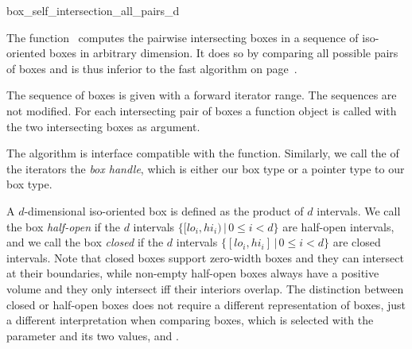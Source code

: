 

\begin{ccRefFunction}{box_self_intersection_all_pairs_d}

\ccDefinition
  
The function \ccRefName\ computes the pairwise intersecting boxes
in a sequence of iso-oriented boxes in arbitrary dimension.
It does so by comparing all possible pairs of boxes and is thus
inferior to the fast  algorithm on 
page~\pageref{ccRef_CGAL::box_self_intersection_d}.

The sequence of boxes is given with a forward iterator range. The
sequences are not modified. For each intersecting pair of boxes a
 function object is called with the two intersecting
boxes as argument.

The algorithm is interface compatible with the
 function. Similarly, we call the
 of the iterators the \emph{box handle}, which is
either our box type or a pointer type to our box type.

A $d$-dimensional iso-oriented box is defined as the
 product of $d$ intervals. We call the
box \emph{half-open} if the $d$ intervals $\{ [lo_i,hi_i) \,|\, 0 \leq
i < d\}$ are half-open intervals, and we call the box \emph{closed} if
the $d$ intervals $\{ [lo_i,hi_i] \,|\, 0 \leq i < d\}$ are closed
intervals. Note that closed boxes support zero-width boxes and they
can intersect at their boundaries, while non-empty half-open boxes
always have a positive volume and they only intersect iff their
interiors overlap.  The distinction between closed or half-open boxes
does not require a different representation of boxes, just a different
interpretation when comparing boxes, which is selected with the
 parameter and its two values,
 and
.


\end{ccRefFunction}
